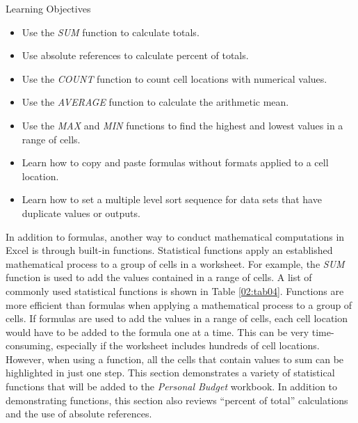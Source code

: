 \begin{center}
	\begin{objbox}{Learning Objectives}
		\begin{itemize}
			\setlength{\itemsep}{0pt}
			\setlength{\parskip}{0pt}
			\setlength{\parsep}{0pt}
			
			\item Use the \textit{SUM} function to calculate totals.
			\item Use absolute references to calculate percent of totals.
			\item Use the \textit{COUNT} function to count cell locations with numerical values.
			\item Use the \textit{AVERAGE} function to calculate the arithmetic mean.
			\item Use the \textit{MAX} and \textit{MIN} functions to find the highest and lowest values in a range of cells.
			\item Learn how to copy and paste formulas without formats applied to a cell location.
			\item Learn how to set a multiple level sort sequence for data sets that have duplicate values or outputs.
			
 		\end{itemize}
	\end{objbox}
\end{center}

In addition to formulas, another way to conduct mathematical computations in Excel is through built-in functions. Statistical functions apply an established mathematical process to a group of cells in a worksheet. For example, the \textit{SUM} function is used to add the values contained in a range of cells. A list of commonly used statistical functions is shown in Table \ref{02:tab04}. Functions are more efficient than formulas when applying a mathematical process to a group of cells. If formulas are used to add the values in a range of cells, each cell location would have to be added to the formula one at a time. This can be very time-consuming, especially if the worksheet includes hundreds of cell locations. However, when using a function, all the cells that contain values to sum can be highlighted in just one step. This section demonstrates a variety of statistical functions that will be added to the \textit{Personal Budget} workbook. In addition to demonstrating functions, this section also reviews ``percent of total'' calculations and the use of absolute references.

